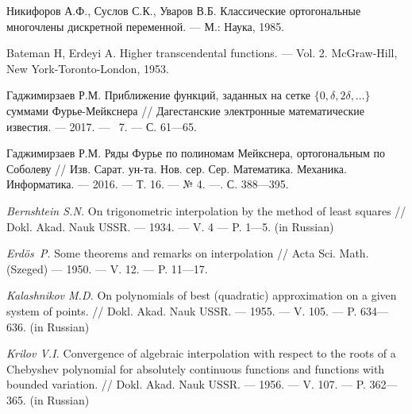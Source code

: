 \begin{thebibliography}{111}
{Никифоров А.Ф., Суслов С.К., Уваров В.Б.} Классические ортогональные многочлены дискретной переменной. --- М.: Наука, 1985.



{Bateman H, Erdeyi A.} Higher transcendental functions. --- Vol. 2. McGraw-Hill, New York-Toronto-London, 1953.




{Гаджимирзаев Р.М.} Приближение функций, заданных на сетке $\{0, \delta, 2\delta, \ldots\}$ суммами Фурье-Мейкснера // Дагестанские электронные математические известия. --- 2017. --- \No\ 7. --- С. 61---65.




{Гаджимирзаев Р.М.} Ряды Фурье по полиномам Мейкснера, ортогональным по Соболеву // Изв. Сарат. ун-та. Нов. сер. Сер. Математика. Механика. Информатика. --- 2016. --- Т. 16. --- № 4. ---. С. 388–--395.



















\textit{Bernshtein S.N.}
On trigonometric interpolation by the method of least squares
 // Dokl. Akad. Nauk USSR. --- 1934. --- V. 4 --- P. 1---5. (in Russian)



\textit{Erd{\"o}s~P.} Some theorems and remarks on interpolation // Acta Sci. Math. (Szeged) --- 1950. --- V. 12. --- P. 11---17.




\textit{Kalashnikov M.D.}
On polynomials of best (quadratic) approximation on a given system of points.
 // Dokl. Akad. Nauk USSR. --- 1955. --- V. 105. --- P. 634---636. (in Russian)



\textit{Krilov V.I.}
Convergence of algebraic interpolation with respect to the roots of a Chebyshev polynomial for absolutely continuous functions and functions with bounded variation.
 // Dokl. Akad. Nauk USSR. --- 1956. --- V. 107. --- P. 362---365. (in Russian)




\end{thebibliography}
